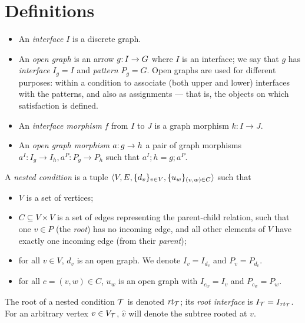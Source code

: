 \section{Definitions}
\label{sec:definitions}

\begin{itemize}
\item An \emph{interface} $I$ is a discrete graph.

\item An \emph{open graph} is an arrow $g{:}\, I\rightarrow G$ where $I$ is an interface; we say that $g$ has \emph{interface} $I_g=I$ and \emph{pattern} $P_g=G$. Open graphs are used for different purposes: within a condition to associate (both upper and lower) interfaces with the patterns, and also as assignments --- that is, the objects on which satisfaction is defined.

\item An \emph{interface morphism} $f$ from $I$ to $J$ is a graph morphism $k:I\to J$.

\item An \emph{open graph morphism} $a{:}\, g\rightarrow h$ a pair of graph morphisms $a^I:I_g\to I_h, a^P:P_g\to P_h$ such that $a^I;h=g;a^P$.
\end{itemize}
%
\begin{definition}\label{def:nested condition}
A \emph{nested condition} is a tuple $\langle V, E, \{{d_v}\}_{v\in V}, \{{u_w}\}_{(v,w)\in C}\rangle$ such that

\begin{itemize}[topsep=\smallskipamount]
\item $V$ is a set of vertices;

\item $C\subseteq V\times V$ is a set of edges representing the parent-child relation, such that one $v\in P$ (the \emph{root}) has no incoming edge, and all other elements of $V$ have exactly one incoming edge (from their \emph{parent});

\item for all $v\in V$, $d_v$ is an open graph. We denote $I_v=I_{d_v}$ and $P_v=P_{d_v}$.

\item for all $c=(v,w)\in C$, $u_w$ is an open graph with $I_{c_w}=I_v$ and $P_{c_w}=P_w$.
\end{itemize}
\end{definition}
%
The root of a nested condition ${\mathcal{T}}$ is denoted $\mathit{rt}_{{\mathcal{T}}}$; its \emph{root interface} is $I_{\mathcal{T}}=I_{\mathit{rt}_{{\mathcal{T}}}}$. For an arbitrary vertex $v\in V_{\mathcal{T}}$, $\hat v$ will denote the subtree rooted at $v$.

